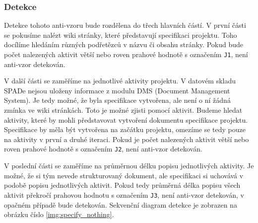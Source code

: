 \documentclass[czech,DP]{thesiskiv}
\begin{document}
\subsubsection{Detekce}
Detekce tohoto anti-vzoru bude rozdělena do třech hlavních částí. V první části se pokusíme nalézt wiki stránky, které představují specifikaci projektu. Toho docílíme hledáním různých podřetězců v názvu či obsahu stránky. Pokud bude počet nalezených aktivit větší nebo roven prahové hodnotě s označením \texttt{J1}, není anti-vzor detekován.
\par
V další části se zaměříme na jednotlivé aktivity projektu. V datovém skladu SPADe nejsou uloženy informace z modulu DMS (Document Management System). Je tedy možné, že byla specifikace vytvořena, ale není o ní žádná zmínka ve wiki stránkách. Toto je možné zjisti pomocí aktivit. Budeme hledat aktivity, které by mohli představovat vytvoření dokumentu specifikace projektu. Specifikace by měla být vytvořena na začátku projektu, omezíme se tedy pouze na aktivity v první a druhé iteraci. Pokud je počet nalezených aktivit větší nebo roven prahové hodnotě s označením \texttt{J2}, není anti-vzor detekován.
\par
V poslední části se zaměříme na průměrnou délku popisu jednotlivých aktivity. Je možné, že si tým nevede strukturovaný dokument, ale specifikaci si uchovává v podobě popisu jednotlivých aktivit. Pokud tedy průměrná délka popisu všech aktivit překročí prahovou hodnotu s označením \texttt{J3}, není anti-vzor detekován, v opačném případě bude detekován. Sekvenční diagram detekce je zobrazen na obrázku číslo \ref{img:specify_nothing}.
\end{document}
